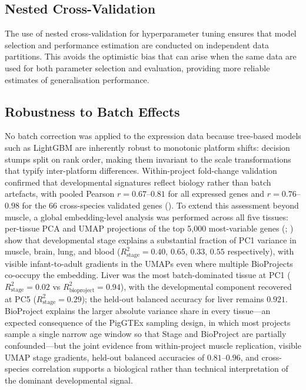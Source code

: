 \subsection{Nested Cross-Validation}

The use of nested cross-validation for hyperparameter tuning ensures that model selection and performance estimation are conducted on independent data partitions. This avoids the optimistic bias that can arise when the same data are used for both parameter selection and evaluation, providing more reliable estimates of generalisation performance.

\subsection{Robustness to Batch Effects}

No batch correction was applied to the expression data because tree-based models such as LightGBM are inherently robust to monotonic platform shifts: decision stumps split on rank order, making them invariant to the scale transformations that typify inter-platform differences. Within-project fold-change validation confirmed that developmental signatures reflect biology rather than batch artefacts, with pooled Pearson $r = 0.67$--$0.81$ for all expressed genes and $r = 0.76$--$0.98$ for the 66 cross-species validated genes (). To extend this assessment beyond muscle, a global embedding-level analysis was performed across all five tissues: per-tissue PCA and UMAP projections of the top 5{,}000 most-variable genes (; ) show that developmental stage explains a substantial fraction of PC1 variance in muscle, brain, lung, and blood ($R^2_{\text{stage}} = 0.40$, $0.65$, $0.33$, $0.55$ respectively), with visible infant-to-adult gradients in the UMAPs even where multiple BioProjects co-occupy the embedding. Liver was the most batch-dominated tissue at PC1 ($R^2_{\text{stage}} = 0.02$ vs $R^2_{\text{bioproject}} = 0.94$), with the developmental component recovered at PC5 ($R^2_{\text{stage}} = 0.29$); the held-out balanced accuracy for liver remains $0.921$. BioProject explains the larger absolute variance share in every tissue---an expected consequence of the PigGTEx sampling design, in which most projects sample a single narrow age window so that Stage and BioProject are partially confounded---but the joint evidence from within-project muscle replication, visible UMAP stage gradients, held-out balanced accuracies of $0.81$--$0.96$, and cross-species correlation supports a biological rather than technical interpretation of the dominant developmental signal.

